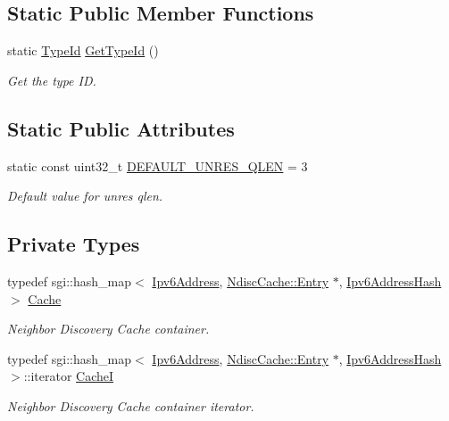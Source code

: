 \subsection*{Static Public Member Functions}
\begin{DoxyCompactItemize}
\item 
static \hyperlink{classns3_1_1TypeId}{Type\+Id} \hyperlink{classns3_1_1NdiscCache_ab339eae41746d77fc035a6793494d363}{Get\+Type\+Id} ()
\begin{DoxyCompactList}\small\item\em Get the type ID. \end{DoxyCompactList}\end{DoxyCompactItemize}
\subsection*{Static Public Attributes}
\begin{DoxyCompactItemize}
\item 
static const uint32\+\_\+t \hyperlink{classns3_1_1NdiscCache_a94090313987a52a1bab8375aac8af3bc}{D\+E\+F\+A\+U\+L\+T\+\_\+\+U\+N\+R\+E\+S\+\_\+\+Q\+L\+EN} = 3
\begin{DoxyCompactList}\small\item\em Default value for unres qlen. \end{DoxyCompactList}\end{DoxyCompactItemize}
\subsection*{Private Types}
\begin{DoxyCompactItemize}
\item 
typedef sgi\+::hash\+\_\+map$<$ \hyperlink{classns3_1_1Ipv6Address}{Ipv6\+Address}, \hyperlink{classns3_1_1NdiscCache_1_1Entry}{Ndisc\+Cache\+::\+Entry} $\ast$, \hyperlink{classns3_1_1Ipv6AddressHash}{Ipv6\+Address\+Hash} $>$ \hyperlink{classns3_1_1NdiscCache_a1267c82e138fe8aac2cfd543e7aa7181}{Cache}
\begin{DoxyCompactList}\small\item\em Neighbor Discovery Cache container. \end{DoxyCompactList}\item 
typedef sgi\+::hash\+\_\+map$<$ \hyperlink{classns3_1_1Ipv6Address}{Ipv6\+Address}, \hyperlink{classns3_1_1NdiscCache_1_1Entry}{Ndisc\+Cache\+::\+Entry} $\ast$, \hyperlink{classns3_1_1Ipv6AddressHash}{Ipv6\+Address\+Hash} $>$\+::iterator \hyperlink{classns3_1_1NdiscCache_ab7894f701404adbd60d92cf8af83ef01}{CacheI}
\begin{DoxyCompactList}\small\item\em Neighbor Discovery Cache container iterator. \end{DoxyCompactList}\end{DoxyCompactItemize}
